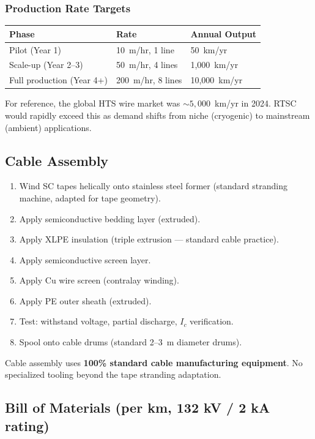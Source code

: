 \documentclass[11pt, a4paper]{article}
\begin{document}
\subsubsection{Production Rate Targets}

\begin{center}
\begin{tabular}{@{}lll@{}}
\toprule
\textbf{Phase} & \textbf{Rate} & \textbf{Annual Output} \\
\midrule
Pilot (Year 1) & 10~m/hr, 1 line & 50~km/yr \\
Scale-up (Year 2--3) & 50~m/hr, 4 lines & 1{,}000~km/yr \\
Full production (Year 4+) & 200~m/hr, 8 lines & 10{,}000~km/yr \\
\bottomrule
\end{tabular}
\end{center}

For reference, the global HTS wire market was $\sim 5{,}000$~km/yr
in 2024. RTSC would rapidly exceed this as demand shifts from
niche (cryogenic) to mainstream (ambient) applications.

\subsection{Cable Assembly}

\begin{enumerate}[nosep]
  \item Wind SC tapes helically onto stainless steel former
        (standard stranding machine, adapted for tape geometry).
  \item Apply semiconductive bedding layer (extruded).
  \item Apply XLPE insulation (triple extrusion --- standard cable
        practice).
  \item Apply semiconductive screen layer.
  \item Apply Cu wire screen (contralay winding).
  \item Apply PE outer sheath (extruded).
  \item Test: withstand voltage, partial discharge, $I_c$
        verification.
  \item Spool onto cable drums (standard 2--3~m diameter drums).
\end{enumerate}

Cable assembly uses \textbf{100\% standard cable manufacturing
equipment}. No specialized tooling beyond the tape stranding
adaptation.

\subsection{Bill of Materials (per km, 132 kV / 2 kA rating)}
\end{document}
